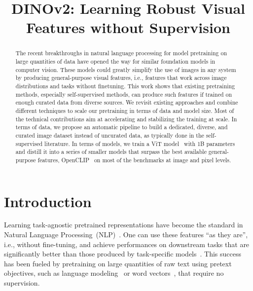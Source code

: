 \title{DINOv2: Learning Robust Visual Features without Supervision}

\begin{abstract}
The recent breakthroughs in natural language processing for model pretraining on large quantities of data have opened the way for similar foundation models in computer vision. These models could greatly simplify the use of images in any system by producing general-purpose visual features, i.e., features that work across image distributions and tasks without finetuning. This work shows that existing pretraining methods, especially self-supervised methods, can produce such features if trained on enough curated data from diverse sources. We revisit existing approaches and combine different techniques to scale our pretraining in terms of data and model size. Most of the technical contributions aim at accelerating and stabilizing the training at scale. In terms of data, we propose an automatic pipeline to build a dedicated, diverse, and curated image dataset instead of uncurated data, as typically done in the self-supervised literature. In terms of models, we train a ViT model~\citep{dosovitskiy2020image} with 1B parameters and distill it into a series of smaller models that surpass the best available general-purpose features, OpenCLIP~\citep{ilharco_gabriel_2021_5143773} on most of the benchmarks at image and pixel levels.
\end{abstract}

\section{Introduction}
\label{sec:intro}
Learning task-agnostic pretrained representations have become the standard in Natural Language Processing~(NLP)~\citep{radford2019language,raffel2020exploring, chowdhery2022palm, hoffmann2022training, touvron2023llama}. One can use these features ``as they are'', i.e., without fine-tuning, and achieve performances on downstream tasks that are significantly better than those produced by task-specific models~\citep{brown2020language}. This success has been fueled by pretraining on large quantities of raw text using pretext objectives, such as language modeling~\citep{radford2017learning} or word vectors~\citep{devlin2018bert}, that require no supervision.

